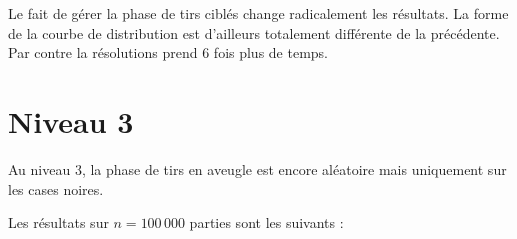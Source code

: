 \begin{center}\label{histo_algo}
\end{center}

Le fait de gérer la phase de tirs ciblés change radicalement les résultats. La forme de la courbe de distribution est d'ailleurs totalement différente de la précédente.\\
Par contre la résolutions prend 6 fois plus de temps.
\newpage
\section{Niveau 3}
Au niveau 3, la phase de tirs en aveugle est encore aléatoire mais uniquement sur les cases noires.

Les résultats sur $n=100\,000$ parties sont les suivants :

\begin{center}\label{histo_algo}
\end{center}

